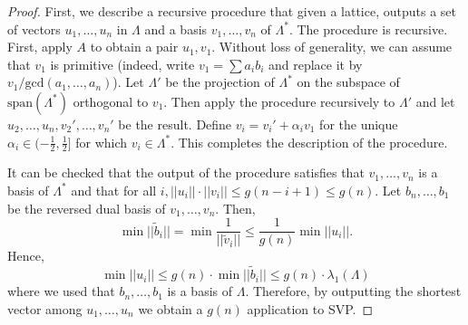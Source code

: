 \begin{proof}
  First, we describe a recursive procedure that given a lattice, outputs a
  set of vectors $u_1,\dots,u_n$ in $\Lambda$ and a basis $v_1,\dots,v_n$ of 
  $\Lambda^*$. The procedure is recursive. First, apply $A$ to obtain a pair
  $u_1,v_1$. Without loss of generality, we can assume that $v_1$ is primitive
  (indeed, write $v_1 =\sum a_ib_i$ and replace it by
  $v_1/\mathrm{gcd}(a_1,\dots,a_n)$). Let $\Lambda'$ be the projection of
  $\Lambda^*$ on the subspace of $\mathrm{span}(\Lambda^*)$ orthogonal to
  $v_1$. Then apply the procedure recursively to $\Lambda'$ and let
  $u_2,\dots,u_n,v_2',\dots,v_n'$ be the result. Define $v_i=
  v_i'+\alpha_iv_1$ for the unique $\alpha_i\in(-\frac{1}{2},\frac{1}{2}]$ for
  which $v_i\in\Lambda^*$. This completes the description of the procedure.
  \par It can be checked that the output of the procedure satisfies that
  $v_1,\dots,v_n$ is a basis of $\Lambda^*$ and that for all $i,
  ||u_i||\cdot||v_i||\leq g(n-i+1)\leq g(n)$. Let $b_n,\dots,b_1$ be the 
  reversed dual basis of $v_1,\dots,v_n$. Then,
  \begin{equation}
    \min||\tilde{b}_i|| = \min\frac{1}{||\tilde{v}_i||}\leq
    \frac{1}{g(n)}\min||u_i||.
  \end{equation}
  Hence,
  \begin{equation}
    \min||u_i||\leq g(n)\cdot\min||\tilde{b}_i||\leq
    g(n)\cdot\lambda_1(\Lambda)
  \end{equation}
where we used that $b_n,\dots,b_1$ is a basis of $\Lambda$. Therefore, by
outputting the shortest vector among $u_1,\dots,u_n$ we obtain a $g(n)$
application to SVP.
\end{proof}
